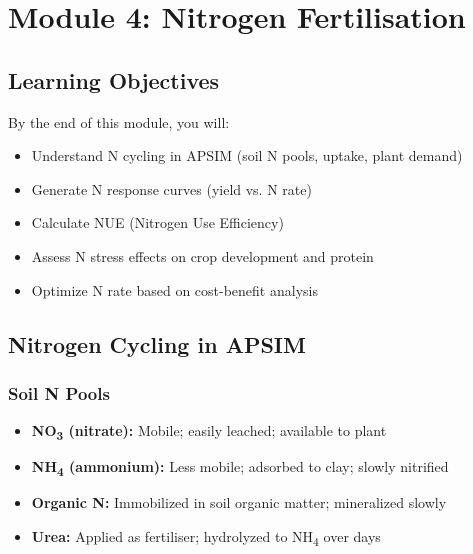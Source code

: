 
\chapter{Module 4: Nitrogen Fertilisation}
\label{ch:module4}

\section{Learning Objectives}

By the end of this module, you will:
\begin{itemize}
  \item Understand N cycling in APSIM (soil N pools, uptake, plant demand)
  \item Generate N response curves (yield vs. N rate)
  \item Calculate NUE (Nitrogen Use Efficiency)
  \item Assess N stress effects on crop development and protein
  \item Optimize N rate based on cost-benefit analysis
\end{itemize}

\section{Nitrogen Cycling in APSIM}

\subsection{Soil N Pools}

\begin{itemize}
  \item \textbf{NO\textsubscript{3} (nitrate):} Mobile; easily leached; available to plant
  \item \textbf{NH\textsubscript{4} (ammonium):} Less mobile; adsorbed to clay; slowly nitrified
  \item \textbf{Organic N:} Immobilized in soil organic matter; mineralized slowly
  \item \textbf{Urea:} Applied as fertiliser; hydrolyzed to NH\textsubscript{4} over days
\end{itemize}

